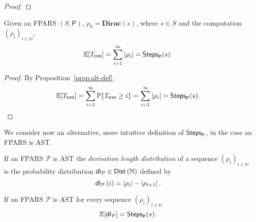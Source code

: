 \begin{LONG}
\begin{proof}
	\end{proof}
	\begin{proposition}
		Given an FPARS $(S,\mathsf{P})$, $\rho_0=\mathbf{Dirac}(s)$,
		where $s\in S$ and the computation $(\rho_i)_{i\in\mathbb{N}}$,
		$$
		\mathbb{E} [ T_{\mathsf{trm}}]=\sum\limits_{i=1}^{\infty} \left|\rho_i\right|=\textsf{Steps}_{\mathsf{P}}(s).
		$$
	\end{proposition}
	\begin{proof}
		By Proposition~\ref{prop:alt-def}, 
		$$
		\mathbb{E} [ T_{\mathsf{trm}}]=\sum\limits_{i=1}^{\infty} \mathbb{P}\{T_{\mathsf{trm}}\geq i\}=\sum\limits_{i=1}^{\infty} \left|\rho_i\right|=\textsf{Steps}_{\mathsf{P}}(s).
		$$
	\end{proof}
	We consider now an alternative, more intuitive definition of $\textsf{Steps}_{\mathsf{P}}$, in the case an FPARS is AST.
	\begin{definition}
		If an FPARS $\mathcal{P}$ is AST the \emph{derivation length distribution} of a sequence $(\rho_i)_{i\in\mathbb{N}}$ is the probability distribution $\mathsf{dl_\mathcal{P}}\in\textsf{Dist}\left(\mathbb{N}\right)$ defined by
		$$
		\mathsf{dl_\mathcal{P}}\left( i\right) =\left|\rho_i\right| -\left|\rho_{i+1}\right|.
		$$
	\end{definition}
	\begin{proposition}
		If an FPARS $\mathcal{P}$ is AST for every sequence $(\rho_i)_{i\in\mathbb{N}}$
		$$
		\mathbb{E}[\mathsf{dl_\mathcal{P}}]=\textsf{Steps}_{\mathsf{P}}(s).
		$$
	\end{proposition}

\end{LONG}
